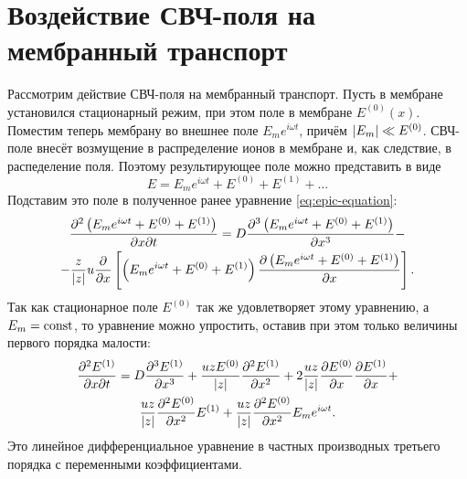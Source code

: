 \section{Воздействие СВЧ-поля на мембранный транспорт}

Рассмотрим действие СВЧ-поля на мембранный транспорт. Пусть в мембране
установился стационарный режим, при этом поле в мембране \( E^{(0)}(x) \).
Поместим теперь мембрану во внешнее поле \( E_m e^{i\omega t} \), причём
\( \left| E_m \right| \ll E^{(0)} \). СВЧ-поле внесёт возмущение в распределение
ионов в мембране и, как следствие, в распеделение поля. Поэтому результирующее
поле можно представить в виде
\begin{equation}
    E = E_m e^{i\omega t} + E^{(0)} + E^{(1)} + \ldots
\end{equation}
Подставим это поле в полученное ранее уравнение \eqref{eq:epic-equation}:
\begin{gather*}
    \frac{\partial^2 \left(E_m e^{i\omega t} + E^{(0)} + E^{(1)}\right)}{\partial x \partial t} =
     D\frac{\partial^3
         \left(E_m e^{i\omega t} + E^{(0)} + E^{(1)}\right)
    }{\partial x^3}
     -\\-
    \frac{z}{\left| z \right|}u\frac{\partial }{\partial x}\left[
    \left(E_m e^{i\omega t} + E^{(0)} + E^{(1)}\right)
    \frac{\partial \left(E_m e^{i\omega t} + E^{(0)} + E^{(1)}\right)}{\partial x}\right].
\end{gather*}
Так как стационарное поле \( E^{(0)} \) так же удовлетворяет этому уравнению,
а \( E_m = \mathrm{const} \), то уравнение можно упростить, оставив при этом только
величины первого порядка малости:
\begin{gather}
    \frac{\partial^2 E^{(1)}}{\partial x \partial t} = D\frac{\partial^3 E^{(1)}}{\partial x^3} +
    \frac{uzE^{(0)}}{\left| z \right|}\frac{\partial^2 E^{(1)}}{\partial {x}^2} +
    2\frac{uz}{\left| z \right|}\frac{\partial E^{(0)}}{\partial x}\frac{\partial E^{(1)}}{\partial x} + \nonumber \\
    \frac{uz}{\left| z \right|}\frac{\partial^2 E^{(0)}}{\partial {x}^2} E^{(1)} +
    \frac{uz}{\left| z \right|}\frac{\partial^2 E^{(0)}}{\partial {x}^2} E_m e^{i\omega t}.
\end{gather}
Это линейное дифференциальное уравнение в частных производных третьего порядка с
переменными коэффициентами.
